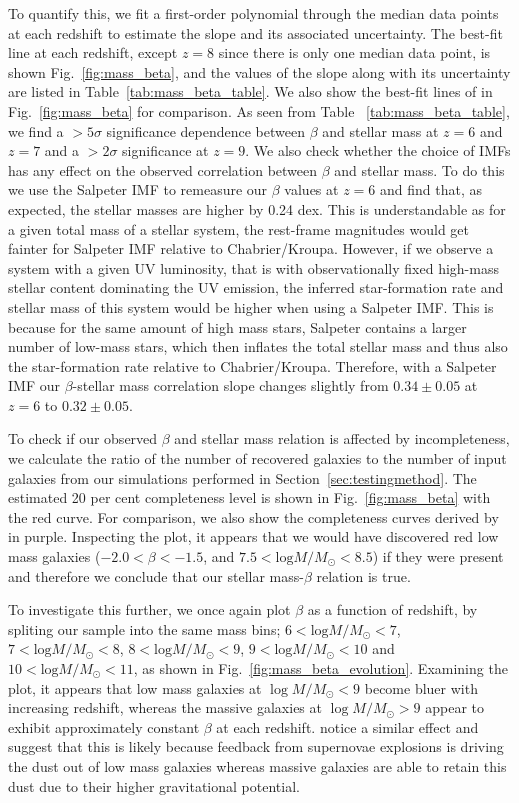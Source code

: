 \documentclass[twocolumn]{aastex63}
\begin{document}
To quantify this, we fit a first-order polynomial through the median data points at each redshift to estimate the slope and its associated uncertainty. The best-fit line at each redshift, except $z=8$ since there is only one median data point, is shown Fig.~\ref{fig:mass_beta}, and the values of the slope along with its uncertainty are listed in Table~\ref{tab:mass_beta_table}. We also show the best-fit lines of \citet{Finkelstein2012} in Fig.~\ref{fig:mass_beta} for comparison. As seen from Table ~\ref{tab:mass_beta_table}, we find a $>5\sigma$ significance dependence between $\beta$ and stellar mass at $z=6$ and $z=7$ and a $>2\sigma$ significance at $z=9$. We also check whether the choice of IMFs has any effect on the observed correlation between $\beta$ and stellar mass. To do this we use the Salpeter IMF to remeasure our $\beta$ values at $z=6$ and find that, as expected, the stellar masses are higher by 0.24 dex. This is understandable as for a given total mass of a stellar system, the rest-frame magnitudes would get fainter for Salpeter IMF relative to Chabrier/Kroupa. However, if we observe a system with a given UV luminosity, that is with observationally fixed high-mass stellar content dominating the UV emission, the inferred star-formation rate and stellar mass of this system would be higher when using a Salpeter IMF. This is because for the same amount of high mass stars, Salpeter contains a larger number of low-mass stars, which then inflates the total stellar mass and thus also the star-formation rate relative to Chabrier/Kroupa. Therefore, with a Salpeter IMF our $\beta$-stellar mass correlation slope changes slightly from $0.34\pm0.05$ at $z=6$ to $0.32\pm0.05$. 


To check if our observed $\beta$ and stellar mass relation is affected by incompleteness, we calculate the ratio of the number of recovered galaxies to the number of input galaxies from our simulations performed in Section~\ref{sec:testingmethod}. The estimated 20 per cent completeness level is shown in Fig.~\ref{fig:mass_beta} with the red curve. For comparison, we also show the completeness curves derived by \citet{Finkelstein2012} in purple. Inspecting the plot, it appears that we would have discovered red low mass galaxies ($-2.0<\beta<-1.5$, and $7.5<\mathrm{log}M/M_{\odot}<8.5$) if they were present and therefore we conclude that our stellar mass-$\beta$ relation is true.


To investigate this further, we once again plot $\beta$ as a function of redshift, by spliting our sample into the same mass bins; $6<\mathrm{log}M/M_{\odot}<7$, $7<\mathrm{log}M/M_{\odot}<8$, $8<\mathrm{log}M/M_{\odot}<9$, $9<\mathrm{log}M/M_{\odot}<10$ and $10<\mathrm{log}M/M_{\odot}<11$, as shown in Fig.~\ref{fig:mass_beta_evolution}. Examining the plot, it appears that low mass galaxies at $\log M/M_{\odot}<9$ become bluer with increasing redshift, whereas the massive galaxies at $\log M/M_{\odot}>9$ appear to exhibit approximately constant $\beta$ at each redshift. \citet{Finkelstein2012} notice a similar effect and suggest that this is likely because feedback from supernovae explosions is driving the dust out of low mass galaxies whereas massive galaxies are able to retain this dust due to their higher gravitational potential.
\end{document}
